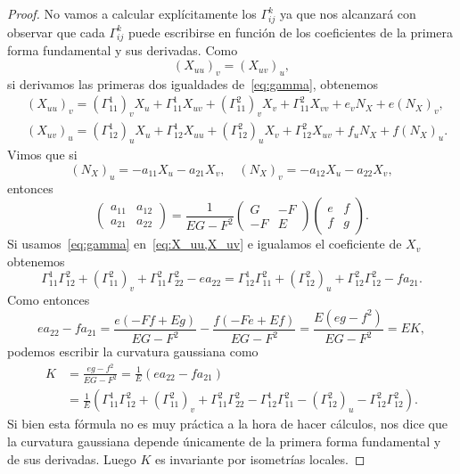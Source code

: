 \begin{proof}
	No vamos a calcular explícitamente los $\Gamma_{ij}^k$ ya que nos alcanzará
	con observar que cada $\Gamma_{ij}^k$ puede escribirse en función de los
	coeficientes de la primera forma fundamental y sus derivadas. Como 
	\[
		(X_{uu})_v=(X_{uv})_u,
	\]
	si derivamos las primeras dos igualdades de~\eqref{eq:gamma}, obtenemos
	\begin{equation}
		\label{eq:X_uu,X_uv}
		\begin{aligned}
			& (X_{uu})_v=(\Gamma_{11}^1)_vX_u+\Gamma_{11}^1X_{uv}+(\Gamma_{11}^2)_vX_v+\Gamma_{11}^2X_{vv}+e_vN_X+e(N_X)_v,\\
			& (X_{uv})_u=(\Gamma_{12}^1)_uX_u+\Gamma_{12}^1X_{uu}+(\Gamma_{12}^2)_uX_v+\Gamma_{12}^2X_{uv}+f_uN_X+f(N_X)_u.
		\end{aligned}
	\end{equation}
	Vimos que si
	\[
		(N_X)_u=-a_{11}X_u-a_{21}X_v,\quad
		(N_X)_v=-a_{12}X_u-a_{22}X_v,
	\]
	entonces
	\[
		\begin{pmatrix}
			a_{11} & a_{12}\\
			a_{21} & a_{22}
		\end{pmatrix}
		=\frac{1}{EG-F^2}\begin{pmatrix}
			G & -F\\
			-F & E
		\end{pmatrix}
		\begin{pmatrix}
			e & f\\
			f & g
		\end{pmatrix}.
	\]
	Si usamos~\eqref{eq:gamma} en~\eqref{eq:X_uu,X_uv} e igualamos el coeficiente de $X_v$ obtenemos
	\[
		\Gamma_{11}^1\Gamma_{12}^2+(\Gamma_{11}^2)_v+\Gamma_{11}^2\Gamma_{22}^2-ea_{22}
		=\Gamma_{12}^1\Gamma_{11}^2+(\Gamma_{12}^2)_u+\Gamma_{12}^2\Gamma_{12}^2-fa_{21}.
	\]
	Como entonces
	\[
		ea_{22}-fa_{21}=\frac{e(-Ff+Eg)}{EG-F^2}-\frac{f(-Fe+Ef)}{EG-F^2}
		=\frac{E(eg-f^2)}{EG-F^2}=EK,
	\]
	podemos escribir la curvatura gaussiana como
	\begin{align*}
		K&=\frac{eg-f^2}{EG-F^2}=\frac{1}{E}(ea_{22}-fa_{21})\\
		&=\frac{1}{E}\left(\Gamma_{11}^1\Gamma_{12}^2+(\Gamma_{11}^2)_v+\Gamma_{11}^2\Gamma_{22}^2
		-\Gamma_{12}^1\Gamma_{11}^2-(\Gamma_{12}^2)_u-\Gamma_{12}^2\Gamma_{12}^2\right).
	\end{align*}
	Si bien esta fórmula no es muy práctica a la hora de hacer cálculos, nos dice que
	la curvatura gaussiana depende únicamente de la primera forma fundamental y
	de sus derivadas. Luego $K$ es invariante por isometrías locales.
\end{proof}

